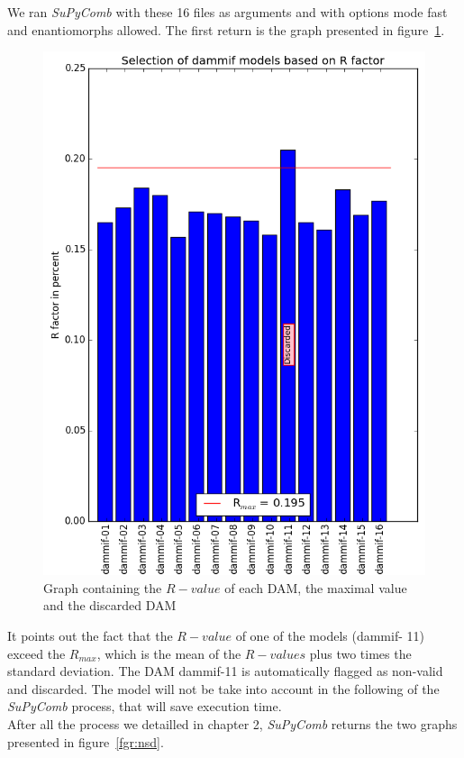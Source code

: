 \documentclass[a4paper, 11pt]{report}
\begin{document}
We ran \textit{SuPyComb} with these 16 files as arguments and with 
options mode fast and enantiomorphs allowed. 
The first return is the graph presented in figure~\ref{fgr:rfactor}. 
\begin{figure}
\centering
\includegraphics[scale=0.6]{Rfactor.png}
\caption{Graph containing the $R-value$ of each DAM, the maximal value 
         and the discarded DAM}
\label{fgr:rfactor}
\end{figure}
It points out the fact that the $R-value$ of one of the models (dammif-
11) exceed the $R_{max}$, which is the mean of the $R-values$ plus two 
times the standard deviation. 
The DAM dammif-11 is automatically flagged as non-valid and discarded. 
The model will not be take into account in the following of the 
\textit{SuPyComb} process, that will save execution time.\\
After all the process we detailled in chapter 2, \textit{SuPyComb} 
returns the two graphs presented in figure~\ref{fgr:nsd}. 
\end{document}
